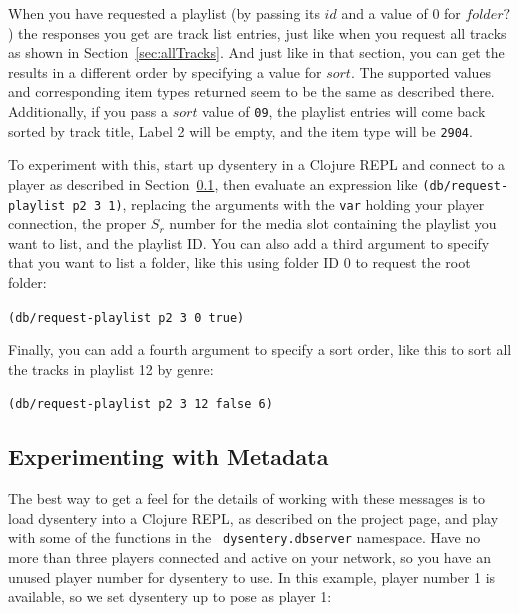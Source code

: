 \documentclass[11pt]{article}
\begin{document}
When you have requested a playlist (by passing its $id$ and a value of
0 for $folder?$) the responses you get are track list entries, just
like when you request all tracks as shown in
Section~\ref{sec:allTracks}. And just like in that section, you can
get the results in a different order by specifying a value for $sort$.
The supported values and corresponding item types returned seem to be
the same as described there. Additionally, if you pass a $sort$ value
of {\tt 09}, the playlist entries will come back sorted by track
title, Label 2 will be empty, and the item type will be {\tt 2904}.

To experiment with this, start up dysentery in a Clojure REPL and
connect to a player as described in Section~\ref{sec:experimenting},
then evaluate an expression like {\tt (db/request-playlist p2 3 1)},
replacing the arguments with the {\tt var} holding your player
connection, the proper $S_r$ number for the media slot containing the
playlist you want to list, and the playlist ID. You can also add a
third argument to specify that you want to list a folder, like this
using folder ID 0 to request the root folder:

{\tt (db/request-playlist p2 3 0 true)}

Finally, you can add a fourth argument to specify a sort order, like
this to sort all the tracks in playlist 12 by genre:

{\tt (db/request-playlist p2 3 12 false 6)}

\subsection{Experimenting with Metadata}
\label{sec:experimenting}

The best way to get a feel for the details of working with these
messages is to load dysentery into a Clojure REPL, as described on the
project page, and play with some of the functions in the {\tt
  dysentery.dbserver} namespace. Have no more than three players
connected and active on your network, so you have an unused player
number for dysentery to use. In this example, player number 1 is
available, so we set dysentery up to pose as player 1:
\end{document}

